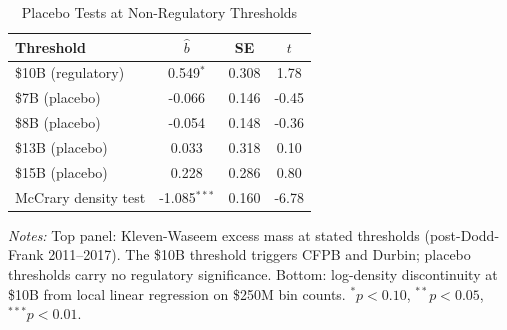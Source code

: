 \begin{table}[htbp]
\centering
\begin{threeparttable}
\caption{Placebo Tests at Non-Regulatory Thresholds}
\label{tab:placebo}
\begin{tabular}{lccc}
\toprule
Threshold & $\hat{b}$ & SE & $t$ \\
\midrule
\$10B (regulatory) & 0.549$^{*}$ & 0.308 & 1.78 \\
\addlinespace
\$7B (placebo) & -0.066 & 0.146 & -0.45 \\
\$8B (placebo) & -0.054 & 0.148 & -0.36 \\
\$13B (placebo) & 0.033 & 0.318 & 0.10 \\
\$15B (placebo) & 0.228 & 0.286 & 0.80 \\
\addlinespace
\midrule
McCrary density test & -1.085$^{***}$ & 0.160 & -6.78 \\
\bottomrule
\end{tabular}
\begin{tablenotes}[flushleft]
\small
\item \textit{Notes:} Top panel: Kleven-Waseem excess mass at stated thresholds (post-Dodd-Frank 2011--2017). The \$10B threshold triggers CFPB and Durbin; placebo thresholds carry no regulatory significance. Bottom: log-density discontinuity at \$10B from local linear regression on \$250M bin counts. $^{*}p<0.10$, $^{**}p<0.05$, $^{***}p<0.01$.
\end{tablenotes}
\end{threeparttable}
\end{table}
